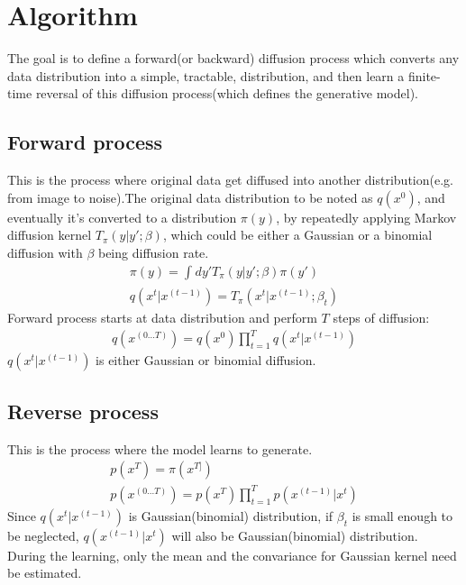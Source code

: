 \documentclass{article}
\begin{document}
\section{Algorithm}
The goal is to define a forward(or backward) diffusion process which converts any data distribution into a simple, tractable, distribution, and then learn a finite-time reversal of this diffusion process(which defines the generative model).
\subsection*{Forward process}
This is the process where original data get diffused into another distribution(e.g. from image to noise).The original data distribution to be noted as $q(x^0)$, and eventually it's converted to a distribution $\pi(y)$, by repeatedly applying Markov diffusion kernel $T_{\pi}(y|y';\beta)$, which could be either a Gaussian or a binomial diffusion with $\beta$ being diffusion rate.
\begin{gather}
\pi(y) = \int_{}^{}dy'T_{\pi}(y|y';\beta)\pi(y')\\
q(x^t|x^{(t-1)}) = T_{\pi}(x^t|x^(t-1);\beta_{t})
\end{gather}
Forward process starts at data distribution and perform $T$ steps of diffusion:
\begin{gather}
q(x^{(0...T)}) = q(x^{0})\prod_{t=1}^{T}q(x^{t}|x^{(t-1)})
\end{gather}
$q(x^{t}|x^{(t-1)})$ is either Gaussian or binomial diffusion.
\subsection*{Reverse process}
This is the process where the model learns to generate.
\begin{gather}
p(x^{T}) = \pi(x^{T]})\\
p(x^{(0...T)}) = p(x^{T})\prod_{t=1}^{T}p(x^{(t-1)}|x^{t})
\end{gather}
Since $q(x^{t}|x^{(t-1)})$ is Gaussian(binomial) distribution, if $\beta_{t}$ is small enough to be neglected, $q(x^{(t-1)}|x^{t})$ will also be Gaussian(binomial) distribution.\\

During the learning, only the mean and the convariance for Gaussian kernel need be estimated.
\end{document}
